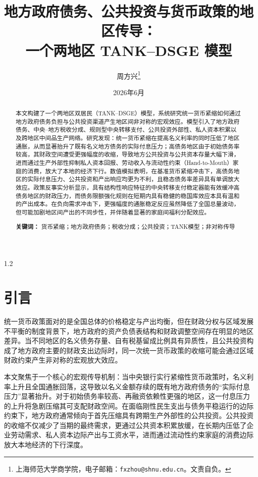 \documentclass[12pt,UTF8]{ctexart}
\title{\textbf{地方政府债务、公共投资与货币政策的地区传导：\\一个两地区 TANK--DSGE 模型}}
\author{\quad 周方兴\thanks{上海师范大学商学院，电子邮箱：\texttt{fxzhou@shnu.edu.cn}。文责自负。} }
\date{2026年6月}
\begin{document}
	\maketitle
	\begin{spacing}{1.2}
		
		\begin{abstract}
			本文构建了一个两地区双居民（TANK--DSGE）模型，系统研究统一货币紧缩如何通过地方政府债务负担与公共投资渠道产生地区间非对称的宏观效应。模型引入了地方政府债务、中央--地方税收分成、规则型中央转移支付、公共投资外部性、私人资本积累以及跨地区中间品生产网络。研究发现：统一货币紧缩在提高名义利率的同时压低了地区通胀，从而显著抬升了既有名义地方债务的实际付息压力；高债务地区由于初始债务率较高，其财政空间遭受更强幅度的收缩，导致地方公共投资与公共资本存量大幅下滑，进而通过生产外部性抑制私人资本回报、劳动收入与流动性约束（Hand-to-Mouth）家庭的消费，放大了本地的经济下行。数值模拟表明，在基准货币紧缩冲击下，高债务地区的实际付息压力、公共投资和产出响应均更为不利，且稳态债务率差异具有单调放大效应。政策反事实分析显示，具有结构性响应特征的中央转移支付稳定器能有效缓冲高债务地区的财政压力，而债务限额强化规则在短期内具有稳健的稳国库效应本具有温和的产出成本。在负向需求冲击下，更强幅度的通胀稳定反应虽然降低了全国总量波动，但可能加剧地区间产出的不同步性，并伴随着显著的家庭间福利分配效应。
			
			\vspace{0.3cm}
			\noindent\textbf{关键词：} 货币紧缩；地方政府债务；税收分成；公共投资；TANK模型；非对称传导
		\end{abstract}
		
		\newpage
		
		\section{引言}
		
		统一货币政策面对的是全国总体的价格稳定与产出均衡，但在财政分权与区域发展不平衡的制度背景下，地方政府的资产负债表结构和财政调整空间存在明显的地区差异。当不同地区的名义债务存量、自有税基留成比例具有异质性，且公共投资构成了地方政府主要的财政支出边际时，同一次统一货币政策的收缩可能会通过区域财政约束产生非对称的宏观放大效应。
		
		本文聚焦于一个核心的宏观传导机制：当中央银行实行紧缩性货币政策时，名义利率上升且全国通胀回落，这导致以名义金额存续的既有地方政府债务的“实际付息压力”显著抬升。对于初始债务率较高、再融资依赖性更强的地区，这一付息压力的上升将急剧压缩其可支配财政空间。在面临刚性民生支出与债务平稳运行的边际约束下，地方政府通常倾向于首先压缩具有跨期生产外部性的公共投资。公共投资的收缩不仅减少了当期的最终需求，更通过公共资本积累放缓，在长期内压低了企业劳动需求、私人资本边际产出与工资水平，进而通过流动性约束家庭的消费边际放大本地经济的下行深度。
		

\end{spacing}
\end{document}
